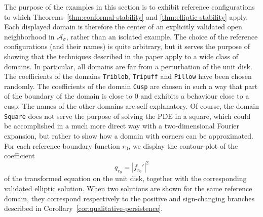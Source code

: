 \documentclass[11pt,a4paper]{amsart}
\begin{document}
The purpose of the examples in this section is to exhibit reference configurations to which
Theorems~\ref{thm:conformal-stability} and \ref{thm:elliptic-stability}
 apply. Each displayed domain is therefore the center of an explicitly validated open neighborhood in $\mathcal A_\sigma$, rather than an isolated example.
The choice of the reference configurations (and their names) is quite arbitrary, but it serves the purpose of showing that the techniques described in the paper apply to a wide class of domains. In particular, all domains are far from a perturbation of the unit disk. The coefficients of the domains {\tt Triblob}, {\tt Tripuff} and {\tt Pillow} have been chosen randomly.  The coefficients of the domain {\tt Cusp} are chosen in such a way that part of the boundary of the domain is close to $0$ and exhibits a behaviour close to a cusp. The names of the other domains are self-explanatory. Of course, the domain {\tt Square} does not serve the purpose of solving the PDE in a square, which could be accomplished in a much more direct way with a two-dimensional Fourier expansion, but rather to show how a domain with corners can be approximated.
For each reference boundary function $r_0$, we display the contour-plot of the coefficient
\[
q_{r_0}=|f_{r_0}'|^2
\]
of the transformed equation on the unit disk, together with the
corresponding validated elliptic solution. When two solutions are
shown for the same reference domain, they correspond respectively to
the positive and sign-changing branches described in
Corollary~\ref{cor:qualitative-persistence}.
\end{document}
